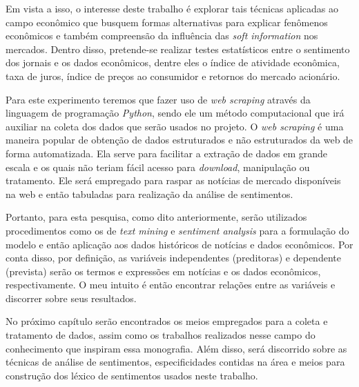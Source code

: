 Em vista a isso, o interesse deste trabalho é explorar tais técnicas aplicadas ao campo econômico que busquem formas alternativas para explicar fenômenos econômicos e também compreensão da influência das \textit{soft information} nos mercados. Dentro disso, pretende-se realizar testes estatísticos entre o sentimento dos jornais e os dados econômicos, dentre eles o índice de atividade econômica, taxa de juros, índice de preços ao consumidor e retornos do mercado acionário.

Para este experimento teremos que fazer uso de \textit{web scraping} através da linguagem de programação \textit{Python}, sendo ele um método computacional que irá auxiliar na coleta dos dados que serão usados no projeto. O \textit{web scraping} é uma maneira popular de obtenção de dados estruturados e não estruturados da web de forma automatizada. Ela serve para facilitar a extração de dados em grande escala e os quais não teriam fácil acesso para \textit{download}, manipulação ou tratamento. Ele será empregado para raspar as notícias de mercado disponíveis na web e então tabuladas para realização da análise de sentimentos.

Portanto, para esta pesquisa, como dito anteriormente, serão utilizados procedimentos como os de \textit{text mining} e \textit{sentiment analysis} para a formulação do modelo e então aplicação aos dados históricos de notícias e dados econômicos. Por conta disso, por definição, as variáveis independentes (preditoras) e dependente (prevista) serão os termos e expressões em notícias e os dados econômicos, respectivamente. O meu intuito é então encontrar relações entre as variáveis e discorrer sobre seus resultados.


No próximo capítulo serão encontrados os meios empregados para a coleta e tratamento de dados, assim como os trabalhos realizados nesse campo do conhecimento que inspiram essa monografia. Além disso, será discorrido sobre as técnicas de análise de sentimentos, especificidades contidas na área e meios para construção dos léxico de sentimentos usados neste trabalho.

